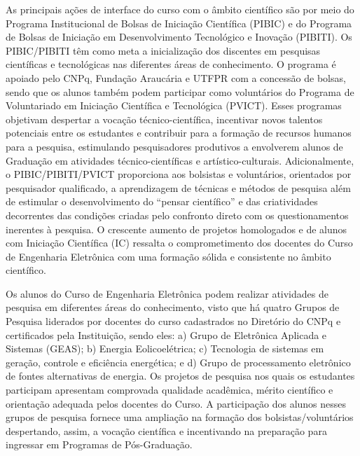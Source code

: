 As principais ações de interface do curso com o âmbito científico são por meio do Programa Institucional de Bolsas de Iniciação Científica (PIBIC) e do Programa de Bolsas de Iniciação em Desenvolvimento Tecnológico e Inovação (PIBITI). Os PIBIC/PIBITI têm como meta a inicialização dos discentes em pesquisas científicas e tecnológicas nas diferentes áreas de conhecimento. O programa é apoiado pelo CNPq, Fundação Araucária e UTFPR com a concessão de bolsas, sendo que os alunos também podem participar como voluntários do Programa de Voluntariado em Iniciação Científica e Tecnológica (PVICT). Esses programas objetivam despertar a vocação técnico-científica, incentivar novos talentos potenciais entre os estudantes e contribuir para a formação de recursos humanos para a pesquisa, estimulando pesquisadores produtivos a envolverem alunos de Graduação em atividades técnico-científicas e artístico-culturais. Adicionalmente, o PIBIC/PIBITI/PVICT proporciona aos bolsistas e voluntários, orientados por pesquisador qualificado, a aprendizagem de técnicas e métodos de pesquisa além de estimular o desenvolvimento do ``pensar científico'' e das criatividades decorrentes das condições criadas pelo confronto direto com os questionamentos inerentes à pesquisa. O crescente aumento de projetos homologados e de alunos com Iniciação Científica (IC) ressalta o comprometimento dos docentes do Curso de Engenharia Eletrônica com uma formação sólida e consistente no âmbito científico. %

Os alunos do Curso de Engenharia Eletrônica podem realizar atividades de pesquisa em diferentes áreas do conhecimento, visto que há quatro Grupos de Pesquisa liderados por docentes do curso cadastrados no Diretório do CNPq e certificados pela Instituição, sendo eles: a) Grupo de Eletrônica Aplicada e Sistemas (GEAS); b) Energia Eolicoelétrica; c) Tecnologia de sistemas em geração, controle e eficiência energética; e d) Grupo de processamento eletrônico de fontes alternativas de energia. Os projetos de pesquisa nos quais os estudantes participam apresentam comprovada qualidade acadêmica, mérito científico e orientação adequada pelos docentes do Curso. A participação dos alunos nesses grupos de pesquisa fornece uma ampliação na formação dos bolsistas/voluntários despertando, assim, a vocação científica e incentivando na preparação para ingressar em Programas de Pós-Graduação.

